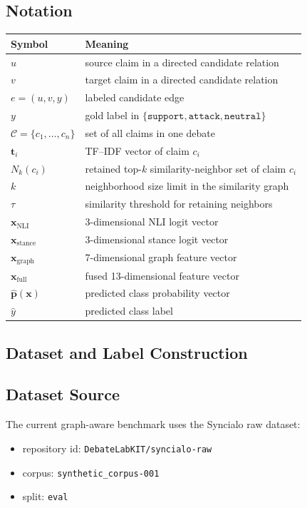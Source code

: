 \documentclass[11pt,a4paper]{article}
\begin{document}
\subsection{Notation}
\begin{center}
\begin{tabular}{ll}
\toprule
Symbol & Meaning \\
\midrule
\(u\) & source claim in a directed candidate relation \\
\(v\) & target claim in a directed candidate relation \\
\(e=(u,v,y)\) & labeled candidate edge \\
\(y\) & gold label in \(\{\texttt{support},\texttt{attack},\texttt{neutral}\}\) \\
\(\mathcal{C}=\{c_1,\dots,c_n\}\) & set of all claims in one debate \\
\(\mathbf{t}_i\) & TF--IDF vector of claim \(c_i\) \\
\(N_k(c_i)\) & retained top-\(k\) similarity-neighbor set of claim \(c_i\) \\
\(k\) & neighborhood size limit in the similarity graph \\
\(\tau\) & similarity threshold for retaining neighbors \\
\(\mathbf{x}_{\mathrm{NLI}}\) & 3-dimensional NLI logit vector \\
\(\mathbf{x}_{\mathrm{stance}}\) & 3-dimensional stance logit vector \\
\(\mathbf{x}_{\mathrm{graph}}\) & 7-dimensional graph feature vector \\
\(\mathbf{x}_{\mathrm{full}}\) & fused 13-dimensional feature vector \\
\(\hat{\mathbf{p}}(\mathbf{x})\) & predicted class probability vector \\
\(\hat{y}\) & predicted class label \\
\bottomrule
\end{tabular}
\end{center}

\subsection{Dataset and Label Construction}
\subsection{Dataset Source}
The current graph-aware benchmark uses the Syncialo raw dataset:
\begin{itemize}[leftmargin=1.5em]
  \item repository id: \texttt{DebateLabKIT/syncialo-raw}
  \item corpus: \texttt{synthetic\_corpus-001}
  \item split: \texttt{eval}
\end{itemize}
\end{document}
